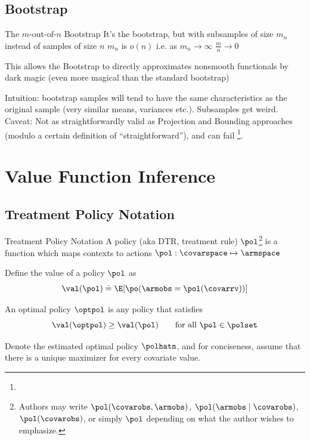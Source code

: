\documentclass[aspectratio=169, professionalfonts, handout]{beamer}
\begin{document}
\subsection{\mon Bootstrap}

\begin{frame}{The $m$-out-of-$n$ Bootstrap}
	It's the bootstrap, but with subsamples of size $m_n$ instead of samples of
	size $n$
	\vfill
	$m_n$ is $o(n)$ i.e. as $m_n \to \infty$ $\frac{m}{n} \to 0$
	\vfill \pause

	This allows the \mon Bootstrap to directly approximates nonsmooth
	functionals by dark magic (even more magical than the standard bootstrap)

	\vfill \pause
	Intuition: bootstrap samples will tend to have the same characteristics as
	the original sample (very similar means, variances etc.). Subsamples get
	weird.
	\vfill \pause
	Caveat: Not as straightforwardly valid as Projection and Bounding approaches
	(modulo a certain definition of ``straightforward''), and can fail
	\footnote<4->{}.
\end{frame}
\section{Value Function Inference}

\subsection{Treatment Policy Notation}

\begin{frame}{Treatment Policy Notation}
	A policy (aka DTR, treatment rule) $\pol$\footnote{	Authors may write $\pol(\covarobs,
			\armobs)$, $\pol(\armobs \mid \covarobs)$, $\pol(\covarobs)$, or
		simply $\pol$ depending on what the author wishes to emphasize.
	} is a function which maps contexts to actions $\pol: \covarspace
		\mapsto \armspace$



	\vfill \pause
	Define the value of a policy $\pol$ as
	\begin{equation*}
		\val(\pol) \doteq \E[\po(\armobs = \pol(\covarrv))]
	\end{equation*}

	\vfill \pause
	An optimal policy $\optpol$ is any policy that satisfies
	\begin{equation*}
		\val(\optpol) \geq \val(\pol) \qquad \text{for all }\pol \in
		\polset
	\end{equation*}

	\vfill \pause
	Denote the estimated optimal policy $\polhatn$, and for conciseness, assume
	that there is a unique maximizer for every covariate value.

\end{frame}
\end{document}
